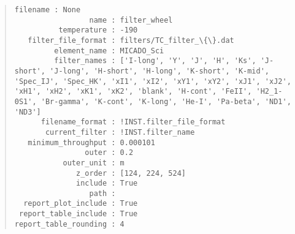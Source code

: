 \begin{quote}
\begin{alltt}
\begin{lstlisting}[frame=single]
             filename : None
                 name : filter_wheel
          temperature : -190
   filter_file_format : filters/TC_filter_\{\}.dat
         element_name : MICADO_Sci
         filter_names : ['I-long', 'Y', 'J', 'H', 'Ks', 'J-short', 'J-long', 'H-short', 'H-long', 'K-short', 'K-mid', 'Spec_IJ', 'Spec_HK', 'xI1', 'xI2', 'xY1', 'xY2', 'xJ1', 'xJ2', 'xH1', 'xH2', 'xK1', 'xK2', 'blank', 'H-cont', 'FeII', 'H2_1-0S1', 'Br-gamma', 'K-cont', 'K-long', 'He-I', 'Pa-beta', 'ND1', 'ND3']
      filename_format : !INST.filter_file_format
       current_filter : !INST.filter_name
   minimum_throughput : 0.000101
                outer : 0.2
           outer_unit : m
              z_order : [124, 224, 524]
              include : True
                 path :
  report_plot_include : True
 report_table_include : True
report_table_rounding : 4
\end{lstlisting}
\end{alltt}
\end{quote}
